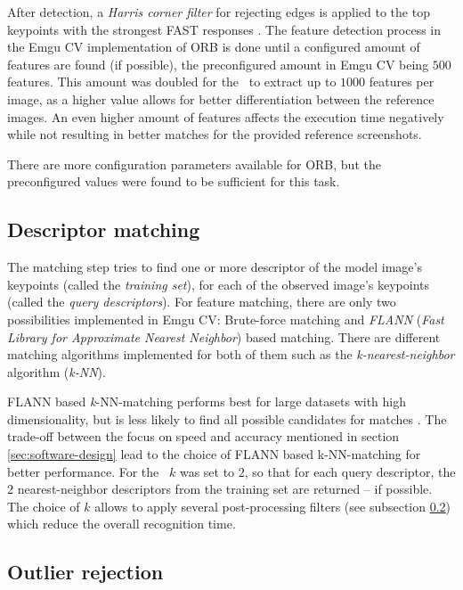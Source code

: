 After detection, a \emph{Harris corner filter} \cite{harris_corner} for rejecting edges is applied to the top keypoints with the strongest FAST responses \cite{orb}. The feature detection process in the Emgu CV implementation of ORB is done until a configured amount of features are found (if possible), the preconfigured amount in Emgu CV being $500$ features. This amount was doubled for the \vd~to extract up to $1000$ features per image, as a higher value allows for better differentiation between the reference images. An even higher amount of features affects the execution time negatively while not resulting in better matches for the provided reference screenshots.

There are more configuration parameters available for ORB, but the preconfigured values were found to be sufficient for this task.

\subsection{Descriptor matching}\label{sec:tech-bg:subsec:descriptor-matching}

The matching step tries to find one or more descriptor of the model image's keypoints (called the \emph{training set}), for each of the observed image's keypoints (called the \emph{query descriptors}). For feature matching, there are only two possibilities implemented in Emgu CV: Brute-force matching and \emph{FLANN} (\emph{Fast Library for Approximate Nearest Neighbor}) \cite{flann} based matching. There are different matching algorithms implemented for both of them such as the \emph{k-nearest-neighbor} algorithm (\emph{k-NN}).

FLANN based \emph{k}-NN-matching performs best for large datasets with high dimensionality, but is less likely to find all possible candidates for matches \cite{flann}. The trade-off between the focus on speed and accuracy mentioned in section \ref{sec:software-design} lead to the choice of FLANN based k-NN-matching for better performance. For the \vd~$k$ was set to $2$, so that for each query descriptor, the $2$ nearest-neighbor descriptors from the training set are returned -- if possible. The choice of $k$ allows to apply several post-processing filters (see subsection \ref{sec:tech-bg:subsec:outlier-rejection}) which reduce the overall recognition time.

\subsection{Outlier rejection}\label{sec:tech-bg:subsec:outlier-rejection}

